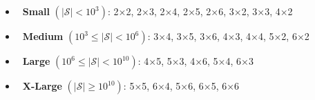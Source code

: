 \vspace{-0.3cm}
\begin{itemize}[leftmargin=0.15cm,itemsep=-1ex,label={}]
    \item{} 
        \greendot{}
        \textbf{\small ~Small}
          {\small $(|\mathcal{S}| < 10^3)$:}
          \scriptsize{2×2, 2×3, 2×4, 2×5, 2×6, 3×2, 3×3, 4×2}
     \item {} 
        \bluedot{}
        \textbf{\small ~Medium}      {\small $(10^3 \leq |\mathcal{S}| < 10^6)$:}
          \scriptsize{3×4, 3×5, 3×6, 4×3, 4×4, 5×2, 6×2} 
     \item  {} \blackdot{}  \textbf{\small ~Large}      {\small $(10^6 \leq |\mathcal{S}| < 10^{10})$:}
          \scriptsize{4×5, 5×3, 4×6, 5×4, 6×3}
    \item \blackdot{}\blackdot{} \textbf{\small ~X-Large}
          {\small $(|\mathcal{S}| \geq 10^{10})$:}
          \scriptsize{5×5, 6×4, 5×6, 6×5, 6×6}
\end{itemize}
\vspace{-0.2cm}


